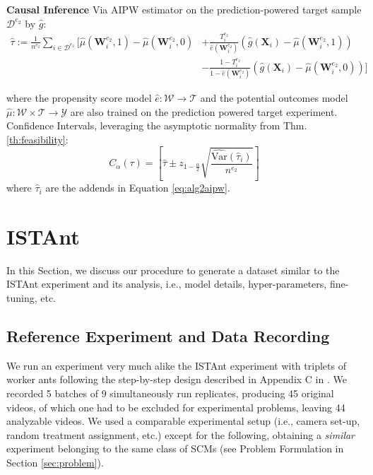 \begin{algorithm*}[h!]
\begin{algorithmic}[1]
    \STATE \qquad \textbf{Causal Inference} Via AIPW estimator on the prediction-powered target sample $\mathcal{D}^{e_2}$ by $\hat{g}$:  
    \begin{equation}
    \label{eq:alg2aipw}
    \begin{split}
       \widehat{\tau} := \frac{1}{n^{e_2}} \sum_{i \in \mathcal{D}^{e_2}} \Bigg[ \widehat{\mu}(\bm{W}_i^{e_2},1) - \widehat{\mu}(\bm{W}_i^{e_2},0) 
        &+ \frac{T_i^{e_2}}{\widehat{e}(\bm{W}_i^{e_2})}  ( \hat{g}(\bm{X}_i) - %
        \widehat{\mu}(\bm{W}_i^{e_2},1) ) 
        \\ & - \frac{1-T_i^{e_2}}{1-\widehat{e}(\bm{W}_i^{e_2})} \left( \hat{g}(\bm{X}_i) - \widehat{\mu}(\bm{W}_i^{e_2},0) \right) \Bigg] 
    \end{split}
    \end{equation}

    where the propensity score model $\hat{e}: \mathcal{W}\rightarrow \mathcal{T}$ and the potential outcomes model $\hat{\mu}: \mathcal{W}\times \mathcal{T}\rightarrow \mathcal{Y}$ are also trained on the prediction powered target experiment. 
    Confidence Intervals, leveraging the asymptotic normality from Thm. \ref{th:feasibility}:
    \begin{equation}
        C_{\alpha}(\tau) = \left[\hat{\tau} \pm z_{1-\frac{\alpha}{2}} \sqrt{\frac{\widehat{\text{Var}}(\hat{\tau}_i)}{n^{e_2}}}\right]
    \end{equation}
    where $\hat{\tau}_i$ are the addends in Equation \ref{eq:alg2aipw}.
\end{algorithmic}
\end{algorithm*}

\newpage
\section{ISTAnt}
\label{sec:istantextra}
In this Section, we discuss our procedure to generate a dataset similar to the ISTAnt experiment and its analysis, i.e., model details, hyper-parameters, fine-tuning, etc.
\subsection{Reference Experiment and Data Recording}
\label{ssec:replica}
We run an experiment very much alike the ISTAnt experiment with triplets of worker ants following the step-by-step design described in Appendix C in \citet{cadei2024smoke}. We recorded 5 batches of 9 simultaneously run replicates, producing 45 original videos, of which one had to be excluded for experimental problems, leaving 44 analyzable videos. 
We used a comparable experimental setup (i.e., camera set-up, random treatment assignment, etc.) except for the following, obtaining a \textit{similar} experiment belonging to the same class of SCMs (see Problem Formulation in Section \ref{sec:problem}). 


